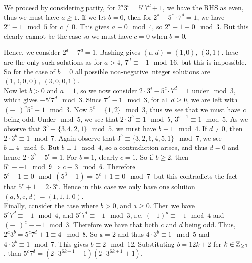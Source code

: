 \begin{solution}\hfil\medskip 

    We proceed by considering parity, for \(2^a3^b=5^c7^d+1\), we have the RHS as even, thus we must have \(a\geq 1\). 
    If we let \(b=0\), then for \(2^a-5^c\cdot7^d=1\), we have \(2^a\equiv 1\mod{5}\) for \(c\ne0\). 
    This gives \(a\equiv0\mod{4}\), so \(2^a-1\equiv0\mod{3}\). 
    But this clearly cannot be the case so we must have \(c=0\) when \(b=0\). 

    Hence, we consider \(2^a-7^d=1\). 
    Bashing gives \((a,d)=(1,0),\ (3,1)\). 
     hese are the only such solutions as for \(a>4,\ 7^d\equiv -1\mod{16}\), but this is impossible. 
    So for the case of \(b=0\) all possible non-negative integer solutions are \((1,0,0,0),\ (3,0,0,1)\).\\

    Now let \(b>0\) and \(a=1\), so we now consider \(2\cdot3^b-5^c\cdot7^d=1\) under\(\mod{3}\), which gives \(-5^c7^d\mod{3}\). 
    Since \(7^d\equiv 1\mod{3}\), for all \(d\geq0\), we are left with \((-1)^c5^c\equiv 1\mod{3}\).
    Now \(5^c=\{1,2\}\mod{3}\), thus we see that we must have \(c\) being odd. Under\(\mod{5}\), we see that \(2\cdot3^b\equiv 1\mod{5}\), \(3^{b-1}\equiv 1\mod 5\). 
    As we observe that \(3^b\equiv\{3,4,2,1\}\mod{5}\), we must have \(b\equiv 1\mod{4}\). 
    If \(d\ne0\), then \(2\cdot3^b\equiv 1\mod{7}\). Again observe that \(3^b\equiv\{3,2,6,4,5,1\}\mod{7}\), we see \(b\equiv 4\mod{6}\). 
    But \(b\equiv 1\mod{4}\), so a contradiction arises, and thus \(d=0\) and hence \(2\cdot3^b-5^c=1\). 
    For \(b=1\), clearly \(c=1\). 
    So if \(b\geq 2\), then \(5^c\equiv-1\mod{9}\Rightarrow c\equiv 3\mod{6}\). 
    Therefore \(5^c+1\equiv0\mod{(5^3+1)}\Rightarrow 5^c+1\equiv0\mod{7}\), but this contradicts the fact that \(5^c+1=2\cdot3^b\). 
    Hence in this case we only have one solution \((a,b,c,d)=(1,1,1,0)\).\\

    Finally, consider the case where \(b>0\), and \(a\geq 0\). 
    Then we have \(5^c7^d\equiv-1\mod{4}\), and \(5^c7^d\equiv-1\mod{3}\), i.e. \((-1)^d\equiv -1\mod{4}\) and \((-1)^c\equiv -1 \mod{3}\). 
    Therefore we have that both \(c\) and \(d\) being odd. Thus, \(2^a3^b=5^c7^d+1\equiv4\mod 8\). 
    So \(a=2\) and thus \(4\cdot 3^b\equiv 1\mod{5}\) and \(4\cdot3^b\equiv 1\mod{7}\). 
    This gives \(b\equiv2\mod{12}\). 
    Substituting \(b=12k+2\) for \(k\in\mathbb{Z}_{\geq0}\), then \(5^c7^d=(2\cdot3^{6k+1}-1)(2\cdot3^{6k+1}+1)\).


\end{solution}

